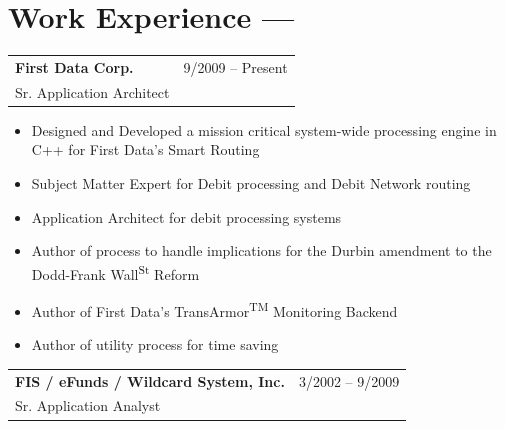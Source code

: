 \documentclass[10pt]{report}
\begin{document}
\pagebreak

\section*{Work Experience ---}

\noindent
\begin{tabular}{ L{.5\textwidth}  R{.4\textwidth} }
\textbf{\large First Data Corp.} & 9/2009 -- Present \\
Sr. Application Architect &
\end{tabular}


\begin{itemize}
\item Designed and Developed a mission critical system-wide processing engine in C++ for First Data's Smart Routing
\item Subject Matter Expert for Debit processing and Debit Network routing 
\item Application Architect for debit processing systems
\item Author of process to handle implications for the Durbin amendment to the Dodd-Frank Wall\textsuperscript{\tiny St} Reform
\item Author of First Data's TransArmor\textsuperscript{\tiny TM} Monitoring Backend
\item Author of utility process for time saving
\end{itemize}
\bigskip

\noindent
\begin{tabular}{ L{.5\textwidth}  R{.4\textwidth} }
\textbf{\large FIS / eFunds / Wildcard System, Inc.} & 3/2002 -- 9/2009 \\
Sr. Application Analyst &
\end{tabular}
\end{document}
